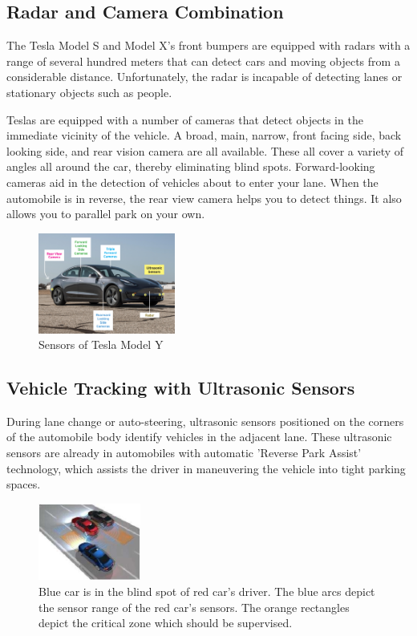\documentclass[letterpaper, 10 pt, conference]{ieeeconf}  %
\begin{document}
\subsection{Radar and Camera Combination} The Tesla Model S and Model X's front bumpers are equipped with radars with a range of several hundred meters that can detect cars and moving objects from a considerable distance. Unfortunately, the radar is incapable of detecting lanes or stationary objects such as people\cite{ingle2016tesla}. 

Teslas are equipped with a number of cameras that detect objects in the immediate vicinity of the vehicle. A broad, main, narrow, front facing side, back looking side, and rear vision camera are all available. These all cover a variety of angles all around the car, thereby eliminating blind spots. Forward-looking cameras aid in the detection of vehicles about to enter your lane. When the automobile is in reverse, the rear view camera helps you to detect things. It also allows you to parallel park on your own.

\begin{figure}[hbt!]
\centering
\includegraphics[width=0.4\textwidth]{gfx/teslaautopilot-sensors.png}
\caption{Sensors of Tesla Model Y}
\end{figure}

\subsection{Vehicle Tracking with Ultrasonic Sensors}

During lane change or auto-steering, ultrasonic sensors positioned on the corners of the automobile body identify vehicles in the adjacent lane. These ultrasonic sensors are already in automobiles with automatic 'Reverse Park Assist' technology, which assists the driver in maneuvering the vehicle into tight parking spaces. 

\begin{figure}[hbt!]
\centering
\includegraphics[width=0.3\textwidth]{gfx/Ultrasonic.jpg}
\caption{Blue car is in the blind spot of red car’s driver.
The blue arcs depict the sensor range of the red car’s
sensors. The orange rectangles depict the critical zone
which should be supervised.}
\end{figure}
\end{document}
